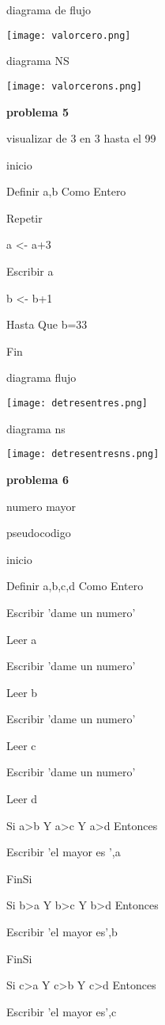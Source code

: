 \documentclass[10pt,a4paper]{article}
\begin{document}
\begin{multicols}{2}
diagrama de flujo 

\texttt{[image: valorcero.png]} 

diagrama NS

\texttt{[image: valorcerons.png]} 


\begin{center}
\textbf{problema 5}
\end{center}

visualizar de 3 en 3 hasta el 99

inicio

Definir a,b Como Entero

	Repetir

		a <- a+3

		Escribir a

		b <- b+1

	Hasta Que b=33

Fin

diagrama flujo 

\texttt{[image: detresentres.png]}

diagrama ns

\texttt{[image: detresentresns.png]}  	

\begin{center}
\textbf{problema 6}
\end{center}

numero mayor

pseudocodigo 

inicio

Definir a,b,c,d Como Entero

	Escribir 'dame un numero'

	Leer a

	Escribir 'dame un numero'

	Leer b

	Escribir 'dame un numero'

	Leer c

	Escribir 'dame un numero'

	Leer d

	Si a>b Y a>c Y a>d Entonces

		Escribir 'el mayor es ',a

	FinSi

	Si b>a Y b>c Y b>d Entonces

		Escribir 'el mayor es',b

	FinSi

	Si c>a Y c>b Y c>d Entonces

		Escribir 'el mayor es',c


\end{multicols}
\end{document}
